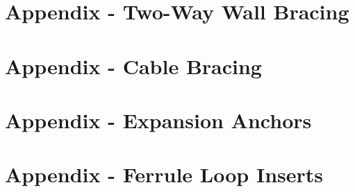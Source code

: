 \documentclass[11pt,letterpaper]{report}
\begin{document}
\setcounter{page}{1}
\section{Appendix  - Two-Way Wall Bracing}
% 

\setcounter{page}{1}
\section{Appendix  - Cable Bracing}
% 

\setcounter{page}{1}
\section{Appendix  - Expansion Anchors}
% 

\setcounter{page}{1}
\section{Appendix  - Ferrule Loop Inserts}
% 
% 

% 
\end{document}
